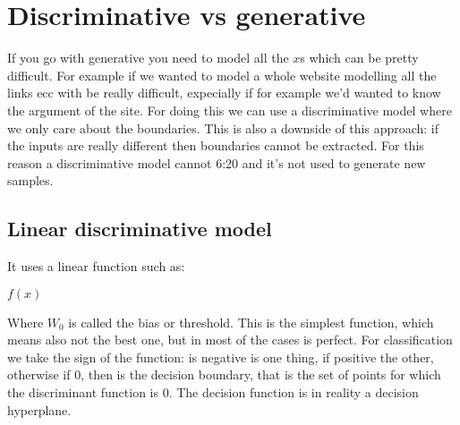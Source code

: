 \chapter{Discriminative vs generative}
If you go with generative you need to model all the $x$s which can be pretty difficult. For example if we wanted to model a whole website modelling all the links ecc with be really difficult, expecially if for example we'd wanted to know the argument of the site. For doing this we can use a discriminative model where we only care about the boundaries. This is also a downside of this approach: if the inputs are really different then boundaries cannot be extracted. For this reason a discriminative model cannot 6:20 and it's not used to generate new samples. 
\section{Linear discriminative model}
It uses a linear function such as:
\begin{center}
	$\displaystyle f(x)$
\end{center}
Where $W_0$ is called the bias or threshold. \newline
This is the simplest function, which means also not the best one, but in most of the cases is perfect.\newline
For classification we take the sign of the function: is negative is one thing, if positive the other, otherwise if 0, then is the decision boundary, that is the set of points for which the discriminant function is 0. \newline
The decision function is in reality a decision hyperplane. 
